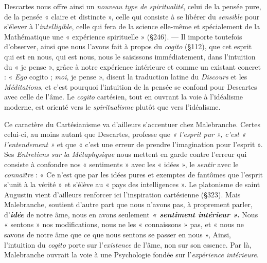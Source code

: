 Descartes nous offre ainsi un {\it nouveau type de spiritualité}, celui
de la pensée pure, de la pensée « claire et distincte », celle qui consiste
à se libérer du {\it sensible} pour s’élever à l’{\it intelligible}, celle qui fera de la
science elle-même et spécialement de la Mathématique une « expérience
spirituelle » (\S 246). — Il importe toutefois d’observer, ainsi
que nous l’avons fait à propos du {\it cogito} (\S 112), que cet esprit qui est
en nous, qui est nous, nous le saisissons immédiatement, dans l’intuition
du « je pense », grâce à notre expérience intérieure et comme un
existant concret : « {\it Ego} cogito ; {\it moi}, je pense », disent la traduction
latine du {\it Discours} et les {\it Méditations}, et c’est pourquoi l’intuition de la
pensée se confond pour Descartes avec celle de l’âme. Le {\it cogito} cartésien,
tout en ouvrant la voie à l’idéalisme moderne, est orienté vers
le {\it spiritualisme} plutôt que vers l’idéalisme.

Ce caractère du Cartésianisme va d’ailleurs s’accentuer chez
Malebranche. Certes celui-ci, au moins autant que Descartes, professe
que {\it « l'esprit pur », c’est « l’entendement »} et que « c’est une
erreur de prendre l’imagination pour l'esprit ». Ses {\it Entretiens sur la
Métaphysique} nous mettent en garde contre l'erreur qui consiste à
confondre nos « sentiments » avec les « idées », le {\it sentir} avec le
{\it connaître} : « Ce n’est que par les idées pures et exemptes de fantômes
que l'esprit s’unit à la vérité » et s'élève au « pays des intelligences ».
Le platonisme de saint Augustin vient d’ailleurs renforcer ici l’inspiration
cartésienne (\S 323). Mais Malebranche, soutient d'autre part
que nous n’avons pas, à proprement parler, d'\textbf{\textit {idée}} de notre âme,
nous en avons seulement \textbf{\textit {« sentiment intérieur ».}} Nous « sentons » nos
modifications, nous ne les « connaissons » pas, et « nous ne savons de
notre âme que ce que nous sentons se passer en nous », Ainsi, l’intuition
du {\it cogito} porte sur l'{\it existence} de l'âme, non sur son essence. Par là,
Malebranche ouvrait la voie à une Psychologie fondée sur l'{\it expérience
intérieure}.

